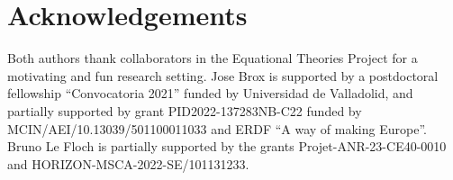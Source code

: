 \section*{Acknowledgements}

Both authors thank collaborators in the Equational Theories Project for a motivating and fun research setting.
Jose Brox is supported by a postdoctoral fellowship “Convocatoria 2021” funded by Universidad de Valladolid, and partially supported by grant PID2022-137283NB-C22 funded by MCIN/AEI/10.13039/501100011033 and ERDF “A way of making Europe”.
Bruno Le Floch is partially supported by the grants Projet-ANR-23-CE40-0010 and HORIZON-MSCA-2022-SE/101131233.
